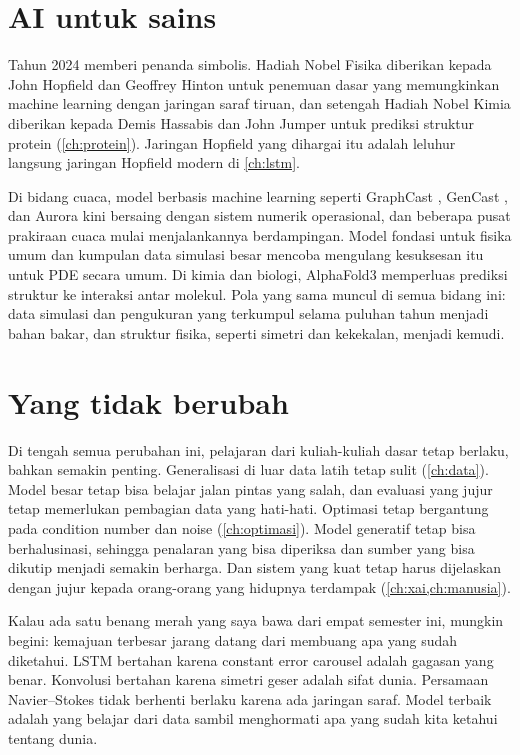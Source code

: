 \section{AI untuk sains}

Tahun 2024 memberi penanda simbolis. Hadiah Nobel Fisika diberikan kepada John Hopfield dan Geoffrey
Hinton untuk penemuan dasar yang memungkinkan machine learning dengan jaringan saraf tiruan, dan
setengah Hadiah Nobel Kimia diberikan kepada Demis Hassabis dan John Jumper untuk prediksi struktur
protein (\cref{ch:protein}). Jaringan Hopfield yang dihargai itu adalah leluhur langsung jaringan Hopfield
modern di \cref{ch:lstm}.

Di bidang cuaca, model berbasis machine learning seperti GraphCast \citep{lam2023}, GenCast
\citep{price2025}, dan Aurora \citep{bodnar2024} kini bersaing dengan sistem numerik operasional, dan
beberapa pusat prakiraan cuaca mulai menjalankannya berdampingan. Model fondasi untuk fisika umum
\citep{mccabe2023,alkin2024} dan kumpulan data simulasi besar \citep{ohana2024} mencoba mengulang
kesuksesan itu untuk PDE secara umum. Di kimia dan biologi, AlphaFold3 \citep{abramson2024} memperluas
prediksi struktur ke interaksi antar molekul. Pola yang sama muncul di semua bidang ini: data simulasi
dan pengukuran yang terkumpul selama puluhan tahun menjadi bahan bakar, dan struktur fisika, seperti
simetri dan kekekalan, menjadi kemudi.

\section{Yang tidak berubah}

Di tengah semua perubahan ini, pelajaran dari kuliah-kuliah dasar tetap berlaku, bahkan semakin penting.
Generalisasi di luar data latih tetap sulit (\cref{ch:data}). Model besar tetap bisa belajar jalan pintas
yang salah, dan evaluasi yang jujur tetap memerlukan pembagian data yang hati-hati. Optimasi tetap
bergantung pada condition number dan noise (\cref{ch:optimasi}). Model generatif tetap bisa
berhalusinasi, sehingga penalaran yang bisa diperiksa dan sumber yang bisa dikutip menjadi semakin
berharga. Dan sistem yang kuat tetap harus dijelaskan dengan jujur kepada orang-orang yang hidupnya
terdampak (\cref{ch:xai,ch:manusia}).

Kalau ada satu benang merah yang saya bawa dari empat semester ini, mungkin begini: kemajuan terbesar
jarang datang dari membuang apa yang sudah diketahui. LSTM bertahan karena constant error carousel adalah
gagasan yang benar. Konvolusi bertahan karena simetri geser adalah sifat dunia. Persamaan Navier--Stokes
tidak berhenti berlaku karena ada jaringan saraf. Model terbaik adalah yang belajar dari data sambil
menghormati apa yang sudah kita ketahui tentang dunia.

